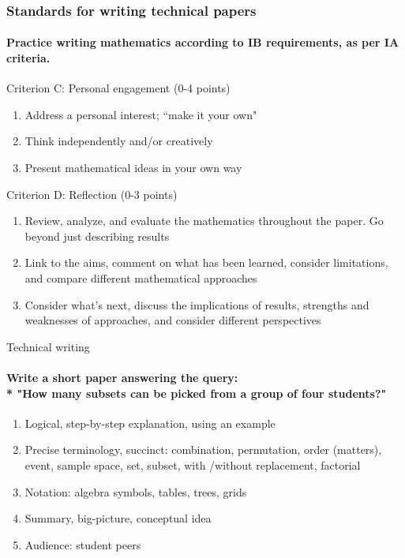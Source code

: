 \documentclass{beamer}
\begin{document}
\frame
{
  \frametitle{Standards for writing technical papers}
  \framesubtitle{Practice writing mathematics according to IB requirements, as per IA criteria.}
Criterion C: Personal engagement (0-4 points)
\begin{enumerate}
    \item Address a personal interest; ``make it your own"
    \item Think independently and/or creatively
    \item Present mathematical ideas in your own way 
\end{enumerate}
Criterion D: Reflection (0-3 points)
\begin{enumerate}
    \item Review, analyze, and evaluate the mathematics throughout the paper. Go beyond just describing results
    \item Link to the aims, comment on what has been learned, consider limitations, and compare different mathematical approaches
    \item Consider what's next, discuss the implications of results, strengths and weaknesses of approaches, and consider different perspectives
\end{enumerate}
}

\begin{frame}{Technical writing}
    \framesubtitle{Write a short paper answering the query: \\* "How many subsets can be picked from a group of four students?"}
    \begin{enumerate}
        \item Logical, step-by-step explanation, using an example
        \item Precise terminology, succinct: combination, permutation, order (matters), event, sample space, set, subset, with /without replacement, factorial
        \item Notation: algebra symbols, tables, trees, grids
        \item Summary, big-picture, conceptual idea
        \item Audience: student peers
    \end{enumerate}
\end{frame}
\end{document}

